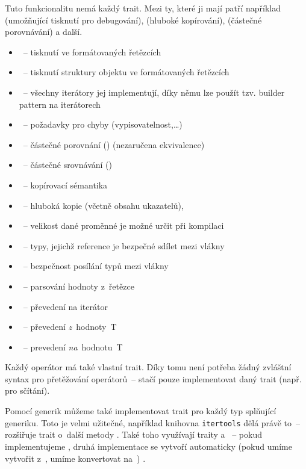 \documentclass[main.tex]{subfiles}
\begin{document}
Tuto funkcionalitu nemá každý trait. Mezi ty, které ji mají patří například
 (umožňující tisknutí pro debugování),  (hluboké kopírování),
 (částečné porovnávání) a další. \cite[Appendix C]{thebook}


\begin{itemize}
    \item {}~-- tisknutí ve formátovaných řetězcích
    \item {}~-- tisknutí struktury objektu ve formátovaných řetězcích
    \item {}~-- všechny iterátory jej implementují, díky němu lze použít
          tzv. builder pattern na iterátorech
    \item {}~-- požadavky pro chyby (vypisovatelnost,\dots)
    \item {}~-- částečné porovnání (\irust{==}) (nezaručena ekvivalence)
    \item {}~-- částečné srovnávání (\irust{< > <= >=})
    \item {}~-- kopírovací sémantika
    \item {}~-- hluboká kopie (včetně obsahu ukazatelů), 
    \item {}~-- velikost dané proměnné je možné určit při kompilaci
    \item {}~-- typy, jejichž reference je bezpečné sdílet mezi vlákny
    \item {}~-- bezpečnost posílání typů mezi vlákny
    \item {}~-- parsování hodnoty z~řetězce
    \item {}~-- převedení na iterátor
    \item {}~-- převedení \emph{z}~hodnoty~T
    \item {}~-- prevedení \emph{na}~hodnotu~T
\end{itemize}
Každý operátor má také vlastní trait. Díky tomu není potřeba žádný zvláštní syntax pro
přetěžování operátorů~-- stačí pouze implementovat daný trait (např.  pro
sčítání). \cite[sekce\,19.2]{thebook}


Pomocí generik můžeme také implementovat trait pro každý typ splňující generiku. Toto je
velmi užitečné, například knihovna \texttt{itertools} dělá právě to~-- rozšiřuje
 trait o~další metody \cite[itertools, src/itertools/lib.rs]{docsrs}. Také
toho využívají traity  a ~-- pokud implementujeme ,
druhá implementace se vytvoří automaticky (pokud umíme vytvořit  z~,
umíme konvertovat  na~) \cite[convert/trait.From]{ruststd}.
\end{document}
